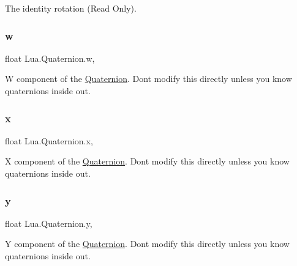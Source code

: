The identity rotation (Read Only). 

\mbox{\label{class_lua_1_1_quaternion_a4a66f5c598907b4d906b0c5dd0e28526}} 
\subsubsection{\texorpdfstring{w}{w}}
{\footnotesize\ttfamily float Lua.\+Quaternion.\+w\hspace{0.3cm}{\ttfamily [get]}, {\ttfamily [set]}}



W component of the \mbox{\hyperlink{class_lua_1_1_quaternion}{Quaternion}}. Don\textquotesingle{}t modify this directly unless you know quaternions inside out. 

\mbox{\label{class_lua_1_1_quaternion_aefb405b7fafa79708a6d8120781debce}} 
\subsubsection{\texorpdfstring{x}{x}}
{\footnotesize\ttfamily float Lua.\+Quaternion.\+x\hspace{0.3cm}{\ttfamily [get]}, {\ttfamily [set]}}



X component of the \mbox{\hyperlink{class_lua_1_1_quaternion}{Quaternion}}. Don\textquotesingle{}t modify this directly unless you know quaternions inside out. 

\mbox{\label{class_lua_1_1_quaternion_ab7eb002a81cfc537a9c3afc8965ef2ec}} 
\subsubsection{\texorpdfstring{y}{y}}
{\footnotesize\ttfamily float Lua.\+Quaternion.\+y\hspace{0.3cm}{\ttfamily [get]}, {\ttfamily [set]}}



Y component of the \mbox{\hyperlink{class_lua_1_1_quaternion}{Quaternion}}. Don\textquotesingle{}t modify this directly unless you know quaternions inside out. 

